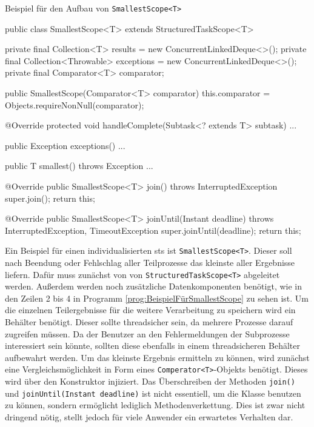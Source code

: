     \begin{program} [H]
        \caption{Beispiel für den Aufbau von \texttt{SmallestScope<T>}}
        \label{prog:BeispielFürSmallestScope}
    \begin{JavaCode}[language=Java, numbers=left]
public class SmallestScope<T> extends StructuredTaskScope<T> {
    private final Collection<T> results = new ConcurrentLinkedDeque<>();
    private final Collection<Throwable> exceptions = new ConcurrentLinkedDeque<>();
    private final Comparator<T> comparator;

    public SmallestScope(Comparator<T> comparator) {
        this.comparator = Objects.requireNonNull(comparator);
    }

    @Override
    protected void handleComplete(Subtask<? extends T> subtask) {...}

    public Exception exceptions() {...}

    public T smallest() throws Exception {...}

    @Override
    public SmallestScope<T> join() throws InterruptedException {
        super.join();
        return this;
    }

    @Override
    public SmallestScope<T> joinUntil(Instant deadline)
        throws InterruptedException, TimeoutException{
            super.joinUntil(deadline);
            return this;
    } 
}\end{JavaCode}
    \end{program}
    
    Ein Beispiel für einen individualisierten \gls{sts} ist \texttt{SmallestScope<T>}. Dieser soll nach Beendung oder Fehlschlag aller Teilprozesse das kleinste 
    aller Ergebnisse liefern.
    Dafür muss zunächst von von \texttt{StructuredTaskScope<T>} abgeleitet werden. Außerdem werden noch zusätzliche Datenkomponenten benötigt, wie in den Zeilen 2 bis 4 in Programm
    \ref{prog:BeispielFürSmallestScope} zu sehen ist. 
    Um die einzelnen Teilergebnisse für die weitere Verarbeitung zu speichern wird ein Behälter benötigt.
    Dieser sollte threadsicher sein, da mehrere Prozesse darauf zugreifen müssen.
    Da der Benutzer an den Fehlermeldungen der Subprozesse interessiert sein könnte, sollten diese ebenfalls in einem threadsicheren Behälter aufbewahrt werden. 
    Um das kleinste Ergebnis ermitteln zu können, wird zunächst eine Vergleichsmöglichkeit in Form eines \texttt{Comperator<T>}-Objekts benötigt. Dieses wird über den
    Konstruktor injiziert.
    Das Überschreiben der Methoden \texttt{join()} und \texttt{joinUntil(Instant deadline)} ist nicht essentiell, um die Klasse benutzen zu können, sondern ermöglicht
    lediglich Methodenverkettung. Dies ist zwar nicht dringend nötig, stellt jedoch für viele Anwender ein erwartetes Verhalten dar.

